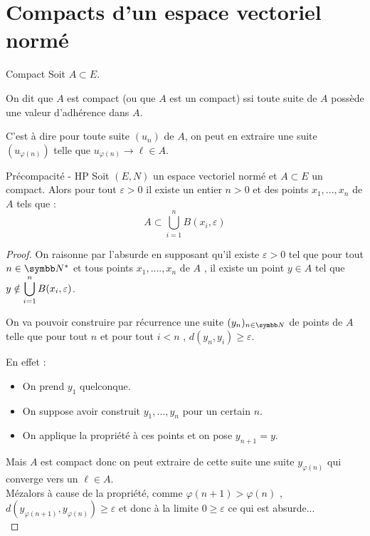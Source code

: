\section{Compacts d'un espace vectoriel normé}

\begin{definition}{Compact}{}
    Soit $A \subset E$. 

    On dit que $A$ est compact (ou que $A$ est un compact) ssi toute suite de $A$ possède une 
    valeur d'adhérence dans $A$.

    \avspace C'est à dire pour toute suite $(u_n)$ de $A$, on peut en extraire une suite 
    $(u_{\varphi(n)})$ telle que $u_{\varphi(n)} \to \ell \in A$.
\end{definition}

\begin{proposition}{Précompacité - HP}{}
Soit $(E,N)$ un espace vectoriel normé et $A\subset E$ un compact.
Alors pour tout $\varepsilon >0$ il existe un entier $n>0$ et des points $x_1,...,x_n$ de $A$ tels que :
\[A \subset \bigcup_{i=1}^n B(x_i,\varepsilon)\]
\end{proposition}

\begin{proof}
On raisonne par l'absurde en supposant qu'il existe $\varepsilon>0$ tel que pour tout $n \in \N^*$ et tous points $x_1,....,x_n$ de $A$ , il existe un point $y\in A$ tel que 
$\displaystyle y \notin \bigcup_{i=1}^n B(x_i,\varepsilon)$.

On va pouvoir construire par récurrence une suite $(y_n)_{n \in \N}$ de points de $A$ telle que pour tout $n$ et pour tout $i<n$ , $d(y_n,y_i)\geqslant \varepsilon$.

En effet :
\begin{itemize}
    \item On prend $y_1$ quelconque.
    \item On suppose avoir construit $y_1,...,y_n$ pour un certain $n$.
    \item On applique la propriété à ces points et on pose $y_{n+1}=y$.
\end{itemize}

Mais $A$ est compact donc on peut extraire de cette suite une suite $y_{\varphi(n)}$ qui converge vers un $\ell \in A$.\\
Mézalors à cause de la propriété, comme $\varphi(n+1)>\varphi(n)$ , $d(y_{\varphi(n+1)},y_{\varphi(n)})\geqslant \varepsilon$ et donc à la limite $0\geqslant \varepsilon$ ce qui est absurde...\\
\end{proof}


